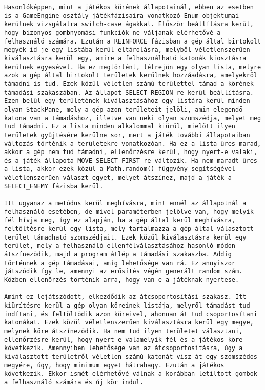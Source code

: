 \begin{verbatim}
Hasonlóképpen, mint a játékos körének állapotainál, ebben az esetben is a GameEngine osztály játékfázisaira vonatkozó Enum objektumai kerülnek vizsgálatra switch-case ágakkal. Először beállításra kerül, hogy bizonyos gombnyomási funkciók ne váljanak elérhetővé a felhasználó számára. Ezután a REINFORCE fázisban a gép által birtokolt megyék id-je egy listába kerül eltárolásra, melyből véletlenszerűen kiválasztásra kerül egy, amire a felhasználható katonák kiosztásra kerülnek egyesével. Ha ez megtörtént, létrejön egy olyan lista, melyre azok a gép által birtokolt területek kerülnek hozzáadásra, amelyekről támadni is tud. Ezek közül véletlen számú területtel támad a körének támadási szakaszában. Az állapot SELECT_REGION-re kerül beállításra. Ezen belül egy területének kiválasztásához egy listára kerül minden olyan StackPane, mely a gép azon területeit jelöli, amin elegendő katona van a támadáshoz, illetve van neki olyan szomszédja, melyet meg tud támadni. Ez a lista minden alkalommal kiürül, mielőtt ilyen területek gyűjtésére kerülne sor, mert a játék további állapotaiban változás történik a területekre vonatkozóan. Ha ez a lista üres marad, akkor a gép nem tud támadni, ellenőrzésre kerül, hogy nyert-e valaki, és a játék állapota MOVE_SELECT_FIRST-re változik. Ha nem maradt üres a lista, akkor ezek közül a Math.random() függvény segítségével véletlenszerűen választ egyet, melyet átszínez, majd a játék a SELECT_ENEMY fázisba kerül. 

Itt ugyanaz a metódus kerül meghívásra, mint ennél az állapotnál a felhasználó esetében, de mivel paraméterben jelölve van, hogy melyik fél hívja meg, így ez alapján, ha a gép által kerül meghívásra, feltöltésre kerül egy lista, mely tartalmazza a gép által választott terület támadható szomszédjait. Ezek közül kiválasztásra kerül egy terület, mely a felhasználó ellenfélválasztásához hasonló módon átszíneződik, majd a program átlép a támadási szakaszba. Addig történnek a gép támadásai, amíg lehetősége van rá. Ez annyiszor játszódik így le, amennyi az erősítés végén generált random szám. Közben ellenőrzés történik arra, hogy van-e a játéknak nyertese. 

Amint ez lejátszódott, elkezdődik az átcsoportosítási szakasz. Itt kiürítésre kerül a gép olyan köreinek listája, melyről támadást tud indítani, és feltöltődik azon köreivel, ahonnan át tud csoportosítani katonákat. Ezek közül véletlenszerűen kiválasztásra kerül egy megye, melynek köre átszíneződik. Ha nem tud ilyen területet választani, ellenőrzésre kerül, hogy nyert-e valamelyik fél és a játékos köre következik. Amennyiben lehetősége van az átcsoportosításra, úgy a kiválasztott területről véletlen számú katonát visz át egy szomszédos megyére, úgy, hogy minimum egyet hátrahagy. Ezután a játékos következik. Ekkor ismét elérhetővé válnak a korábban letiltott gombok a felhasználó számára és új kör indul. 


\end{verbatim}
